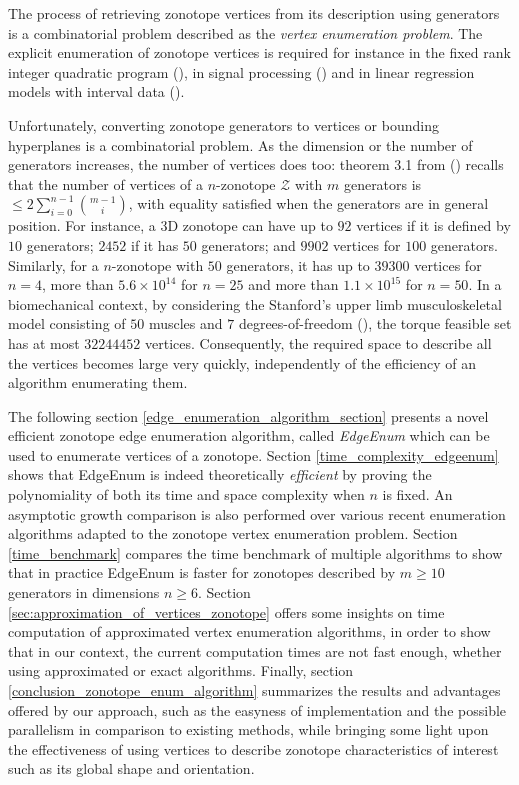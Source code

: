 The process of retrieving zonotope vertices from its description using generators is a combinatorial problem described as the \emph{vertex enumeration problem}. The explicit enumeration of zonotope vertices is required for instance in the fixed rank integer quadratic program (\cite{ferrezSolvingFixedRank2005a}), in signal processing (\cite{markopoulosOptimalAlgorithmsL_12014}) and in linear regression models with interval data (\cite{cernyPossibilisticApproachLinear2013}).

Unfortunately, converting zonotope generators to vertices or bounding hyperplanes is a combinatorial problem. As the dimension or the number of generators increases, the number of vertices does too: theorem 3.1 from (\cite{ferrezSolvingFixedRank2005a}) recalls that the number of vertices of a $n$-zonotope $\mathcal{Z}$ with $m$ generators is $\leq 2 \sum_{i=0}^{n-1} \binom{m-1}{i}$, with equality satisfied when the generators are in general position. For instance, a 3D zonotope can have up to $92$ vertices if it is defined by $10$ generators; $2452$ if it has $50$ generators; and $9902$ vertices for $100$ generators. Similarly, for a $n$-zonotope with $50$ generators, it has up to $39300$ vertices for $n=4$, more than $5.6\times 10^{14}$ for $n=25$ and more than $1.1\times 10^{15}$ for $n=50$. In a biomechanical context, by considering the Stanford's upper limb musculoskeletal model consisting of $50$ muscles and $7$ degrees-of-freedom (\cite{holzbaurModelUpperExtremity2005}), the torque feasible set has at most $32244452$ vertices. Consequently, the required space to describe all the vertices becomes large very quickly, independently of the efficiency of an algorithm enumerating them. 

The following section \ref{edge_enumeration_algorithm_section} presents a novel efficient zonotope edge enumeration algorithm, called \emph{EdgeEnum} which can be used to enumerate vertices of a zonotope. Section \ref{time_complexity_edgeenum} shows that EdgeEnum is indeed theoretically \emph{efficient} by proving the polynomiality of both its time and space complexity when $n$ is fixed. An asymptotic growth comparison is also performed over various recent enumeration algorithms adapted to the zonotope vertex enumeration problem. Section \ref{time_benchmark} compares the time benchmark of multiple algorithms to show that in practice EdgeEnum is faster for zonotopes described by $m\geq 10$ generators in dimensions $n\geq 6$. Section \ref{sec:approximation_of_vertices_zonotope} offers some insights on time computation of approximated vertex enumeration algorithms, in order to show that in our context, the current computation times are not fast enough, whether using approximated or exact algorithms. Finally, section \ref{conclusion_zonotope_enum_algorithm} summarizes the results and advantages offered by our approach, such as the easyness of implementation and the possible parallelism in comparison to existing methods, while bringing some light upon the effectiveness of using vertices to describe zonotope characteristics of interest such as its global shape and orientation.

